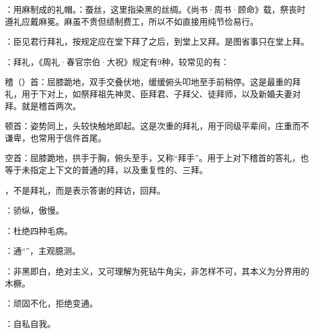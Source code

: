 {
\item {}：用麻制成的礼帽。：蚕丝，这里指染黑的丝绸。《尚书·周书·顾命》载，祭丧时遵礼应戴麻冕。麻虽不贵但绩制费工，所以不如直接用纯节俭易行。
\item {}：臣见君行拜礼，按规定应在堂下拜了之后，到堂上又拜。是图省事只在堂上拜。%

：拜礼，《周礼·春官宗伯·大祝》规定有9种，较常见的有：
\begin{lyitemize}
\item 稽（）首：屈膝跪地，双手交叠伏地，缓缓俯头叩地至手前稍停。这是最重的拜礼，用于下对上，如祭拜祖先神灵、臣拜君、子拜父、徒拜师，以及新婚夫妻对拜。就是稽首两次。
\item 顿首：姿势同上，头较快触地即起。这是次重的拜礼，用于同级平辈间，庄重而不谦卑，也常用于信件首尾。
\item {}空首：屈膝跪地，拱手于胸，俯头至手，又称“拜手”。用于上对下稽首的答礼，也等于未指定上下文的普通的拜，以及重复性的、三拜。
\end{lyitemize}
 ，不是拜礼，而是表示答谢的拜访，回拜。
\item {}：骄纵，傲慢。
}
{}


{
\item {}：杜绝四种毛病。
\item {}：通“”，主观臆测。
\item {}：非黑即白，绝对主义，又可理解为死钻牛角尖，非怎样不可，其本义为分界用的木橛。%
\item {}：顽固不化，拒绝变通。
\item {}：自私自我。
}
{}


